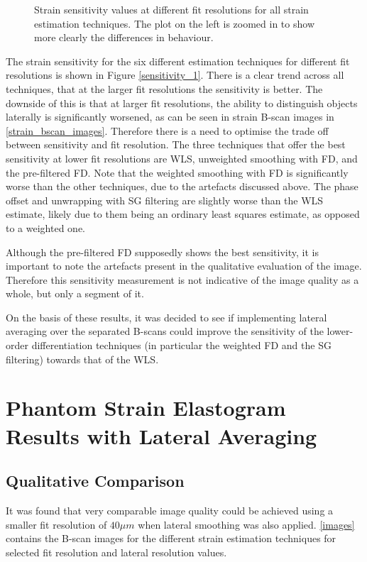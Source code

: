 \begin{figure}[b!]
\begin{subfigure}{0.49\textwidth}
    \end{subfigure}
    \caption{Strain sensitivity values at different fit resolutions for all strain estimation techniques. The plot on the left is zoomed in to show more clearly the differences in behaviour.}
	\label{sensitivity_1}
\end{figure}

The strain sensitivity for the six different estimation techniques for different fit resolutions is shown in Figure \autoref{sensitivity_1}. There is a clear trend across all techniques, that at the larger fit resolutions the sensitivity is better. The downside of this is that at larger fit resolutions, the ability to distinguish objects laterally is significantly worsened, as can be seen in strain B-scan images in \autoref{strain_bscan_images}. Therefore there is a need to optimise the trade off between sensitivity and fit resolution. The three techniques that offer the best sensitivity at lower fit resolutions are WLS, unweighted smoothing with FD, and the pre-filtered FD. Note that the weighted smoothing with FD is significantly worse than the other techniques, due to the artefacts discussed above. The phase offset and unwrapping with SG filtering are slightly worse than the WLS estimate, likely due to them being an ordinary least squares estimate, as opposed to a weighted one.

Although the pre-filtered FD supposedly shows the best sensitivity, it is important to note the artefacts present in the qualitative evaluation of the image. Therefore this sensitivity measurement is not indicative of the image quality as a whole, but only a segment of it.

On the basis of these results, it was decided to see if implementing lateral averaging over the separated B-scans could improve the sensitivity of the lower-order differentiation techniques (in particular the weighted FD and the SG filtering) towards that of the WLS. 

\section{Phantom Strain Elastogram Results with Lateral Averaging}\label{phantom_results_lateral}

\subsection{Qualitative Comparison}
It was found that very comparable image quality could be achieved using a smaller fit resolution of $40\mu m$ when lateral smoothing was also applied. \autoref{images} contains the B-scan  images for the different strain estimation techniques for selected fit resolution and lateral resolution values. 

